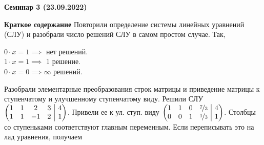 \documentclass[10pt, a4paper]{extarticle}
\makeatletter
\theoremstyle{definition}
\newenvironment{amatrix}[2]{%
    \left(\begin{array}{@{}*{#1}{c}|*{#2}{c}@{}}
}{%
    \end{array}\right)
}
\makeatother
\begin{document}
\begin{center}
\small
\noindent{}
\end{center}

\large

\begin{center}
\textbf{Семинар 3 (23.09.2022)}
\end{center}

\textbf{Краткое содержание}
Повторили определение системы линейных уравнений (СЛУ) и разобрали число решений СЛУ в самом простом случае. Так,

$0 \cdot x = 1 \implies $ нет решений. \\
$1 \cdot x = 1 \implies $ 1 решение. \\
$0 \cdot x = 0 \implies \infty $ решений.


Разобрали элементарные преобразования строк матрицы и приведение матрицы к ступенчатому и улучшенному ступенчатому виду. Решили СЛУ
$\begin{amatrix}{4}{1}
   1 & 1 & 2 & 3 & 4\\
   1 & 1 & -1 & 2 & 1
\end{amatrix}$. 
Привели ее к ул. ступ. виду 
$\begin{amatrix}{4}{1}
    1 & 1 & 0 & \nicefrac{7}{3} & 4\\
    0 & 0 & 1 & \nicefrac{1}{3} & 1
 \end{amatrix}$. Столбцы со ступеньками соответствуют главным переменным. Если переписывать это на лад уравнения, получаем
\end{document}

